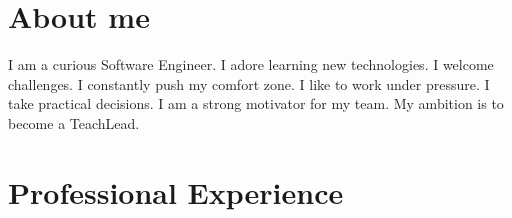 \documentclass[11pt]{article}
\begin{document}
\begin{minipage}[t]{0.65\textwidth}

  \section*{About me}
  I am a curious Software Engineer. I adore learning new technologies. I welcome
  challenges. I constantly push my comfort zone. I like to work under pressure.
  I take practical decisions. I am a strong motivator for my team. My ambition
  is to become a TeachLead.

  \section*{Professional Experience}
  \newcommand{\job}[5]{
    \small#3 & \normalsize\textbf{#1}, \textit{#2} \\
    \small#4 &
    \begin{compactitem}
      #5
    \end{compactitem} \\\\
  }


\end{minipage}
\end{document}
